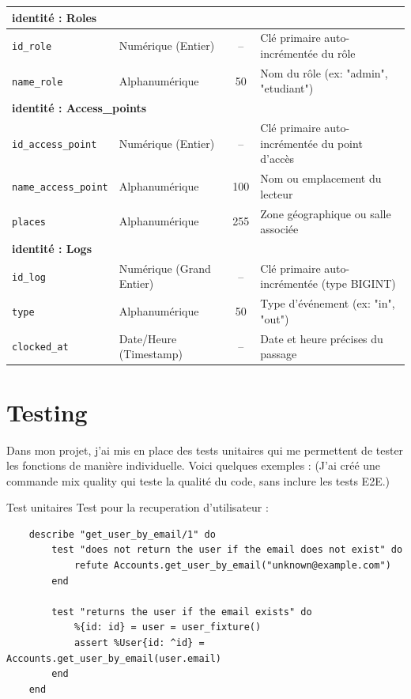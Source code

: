 \begin{longtable}{p{3.5cm} p{3.5cm} c p{6.5cm}}
    \multicolumn{4}{l}{\textbf{identité : Roles}} \\
        \hline
        \texttt{id\_role} & Numérique (Entier) & -- & Clé primaire auto-incrémentée du rôle \\
        \texttt{name\_role} & Alphanumérique & 50 & Nom du rôle (ex: "admin", "etudiant") \\
    \midrule

    \multicolumn{4}{l}{\textbf{identité : Access\_points}} \\
        \hline
        \texttt{id\_access\_point} & Numérique (Entier) & -- & Clé primaire auto-incrémentée du point d'accès \\
        \texttt{name\_access\_point} & Alphanumérique & 100 & Nom ou emplacement du lecteur \\
        \texttt{places} & Alphanumérique & 255 & Zone géographique ou salle associée \\
    \midrule

    \multicolumn{4}{l}{\textbf{identité : Logs}} \\
        \hline
        \texttt{id\_log} & Numérique (Grand Entier) & -- & Clé primaire auto-incrémentée (type BIGINT) \\
        \texttt{type} & Alphanumérique & 50 & Type d'événement (ex: "in", "out") \\
        \texttt{clocked\_at} & Date/Heure (Timestamp) & -- & Date et heure précises du passage \\

\end{longtable}

\newpage

\section{Testing}
\hypertarget{cible:test}{}
Dans mon projet, j’ai mis en place des tests unitaires qui me permettent de tester les fonctions de manière individuelle.
Voici quelques exemples : \newline
(J’ai créé une commande mix quality qui teste la qualité du code, sans inclure les tests E2E.) \newline


\begin{for_you}{Test unitaires}
    Test pour la recuperation d'utilisateur :
    \begin{lstlisting}
    describe "get_user_by_email/1" do
        test "does not return the user if the email does not exist" do
            refute Accounts.get_user_by_email("unknown@example.com")
        end

        test "returns the user if the email exists" do
            %{id: id} = user = user_fixture()
            assert %User{id: ^id} = Accounts.get_user_by_email(user.email)
        end
    end
    \end{lstlisting}
\end{for_you}

